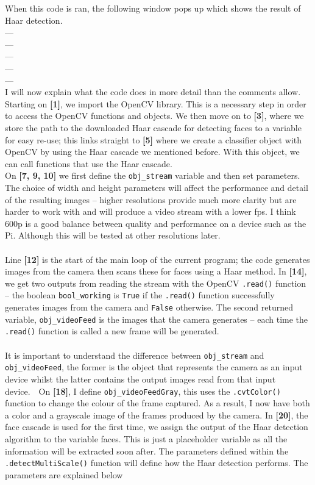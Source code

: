 \documentclass[9pt]{article}
\begin{document}
When this code is ran, the following window pops up which shows the result of Haar detection.
\\
---\\
---\\
---\\
---\\
---\\
I will now explain what the code does in more detail than the comments allow.\\
Starting on \textbf{[1]}, we import the OpenCV library. This is a necessary step in order to access the OpenCV functions and objects. We then move on to \textbf{[3]}, where we store the path to the downloaded Haar cascade for detecting faces to a variable for easy re-use; this links straight to \textbf{[5]} where we create a classifier object with OpenCV by using the Haar cascade we mentioned before. With this object, we can call functions that use the Haar cascade.\\
On \textbf{[7, 9, 10]} we first define the \texttt{obj\_stream} variable and then set parameters. The choice of width and height parameters will affect the performance and detail of the resulting images -- higher resolutions provide much more clarity but are harder to work with and will produce a video stream with a lower fps. I think 600p is a good balance between quality and performance on a device such as the Pi. Although this will be tested at other resolutions later.\\\\
Line \textbf{[12]} is the start of the main loop of the current program; the code generates images from the camera then scans these for faces using a Haar method. In \textbf{[14]}, we get two outputs from reading the stream with the OpenCV \texttt{.read()} function -- the boolean \texttt{bool\_working} is \texttt{True} if the \texttt{.read()} function successfully generates images from the camera and \texttt{False} otherwise. The second returned variable, \texttt{obj\_videoFeed} is the images that the camera generates -- each time the \texttt{.read()} function is called a new frame will be generated.\\\\
It is important to understand the difference between \texttt{obj\_stream} and \texttt{obj\_videoFeed}, the former is the object that represents the camera as an input device whilst the latter contains the output images read from that input device.\	\
On \textbf{[18]}, I define \texttt{obj\_videoFeedGray}, this uses the \texttt{.cvtColor()} function to change the colour of the frame captured. As a result, I now have both a color and a grayscale image of the frames produced by the camera. In \textbf{[20]}, the face cascade is used for the first time, we assign the output of the Haar detection algorithm to the variable faces. This is just a placeholder variable as all the information will be extracted soon after. The parameters defined within the \texttt{.detectMultiScale()} function will define how the Haar detection performs. The parameters are explained below
\end{document}
